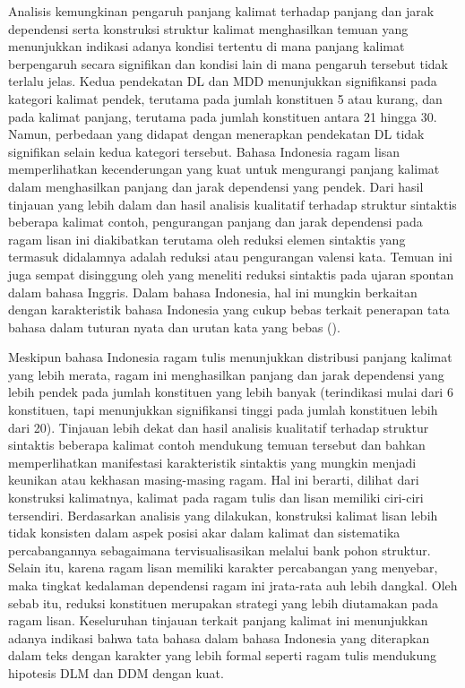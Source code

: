 Analisis kemungkinan pengaruh panjang kalimat terhadap panjang dan jarak dependensi serta konstruksi struktur kalimat menghasilkan temuan yang menunjukkan indikasi adanya kondisi tertentu di mana panjang kalimat berpengaruh secara signifikan dan kondisi lain di mana pengaruh tersebut tidak terlalu jelas. Kedua pendekatan DL dan MDD menunjukkan signifikansi pada kategori kalimat pendek, terutama pada jumlah konstituen 5 atau kurang, dan pada kalimat panjang, terutama pada jumlah konstituen antara 21 hingga 30. Namun, perbedaan yang didapat dengan menerapkan pendekatan DL tidak signifikan selain kedua kategori tersebut. Bahasa Indonesia ragam lisan memperlihatkan kecenderungan yang kuat untuk mengurangi panjang kalimat dalam menghasilkan panjang dan jarak dependensi yang pendek. Dari hasil tinjauan yang lebih dalam dan hasil analisis kualitatif terhadap struktur sintaktis beberapa kalimat contoh, pengurangan panjang dan jarak dependensi pada ragam lisan ini diakibatkan terutama oleh reduksi elemen sintaktis yang termasuk didalamnya adalah reduksi atau pengurangan valensi kata. Temuan ini juga sempat disinggung oleh \cite{jaeger2006redundancy} yang meneliti reduksi sintaktis  pada ujaran spontan dalam bahasa Inggris. Dalam bahasa Indonesia, hal ini mungkin berkaitan dengan karakteristik bahasa Indonesia yang cukup bebas terkait penerapan tata bahasa dalam tuturan nyata \citep{sneddon2010indonesian} dan urutan kata yang bebas (\citealp{sneddon2010indonesian, kridalaksana2002struktur}). 

Meskipun bahasa Indonesia ragam tulis menunjukkan distribusi panjang kalimat yang lebih merata, ragam ini menghasilkan panjang dan jarak dependensi yang lebih pendek pada jumlah konstituen yang lebih banyak (terindikasi mulai dari 6 konstituen, tapi menunjukkan signifikansi tinggi pada jumlah konstituen lebih dari 20). Tinjauan lebih dekat dan hasil analisis kualitatif terhadap struktur sintaktis beberapa kalimat contoh mendukung temuan tersebut dan bahkan memperlihatkan manifestasi karakteristik sintaktis yang mungkin menjadi keunikan atau kekhasan masing-masing ragam. Hal ini berarti, dilihat dari konstruksi kalimatnya, kalimat pada ragam tulis dan lisan memiliki ciri-ciri tersendiri. Berdasarkan analisis yang dilakukan, konstruksi kalimat lisan lebih tidak konsisten dalam aspek posisi akar dalam kalimat dan sistematika percabangannya sebagaimana tervisualisasikan melalui bank pohon struktur. Selain itu, karena ragam lisan memiliki karakter percabangan yang menyebar, maka tingkat kedalaman dependensi ragam ini jrata-rata auh lebih dangkal. Oleh sebab itu, reduksi konstituen merupakan strategi yang lebih diutamakan pada ragam lisan. Keseluruhan tinjauan terkait panjang kalimat ini menunjukkan adanya indikasi bahwa tata bahasa dalam bahasa Indonesia yang diterapkan dalam teks dengan karakter yang lebih formal seperti ragam tulis mendukung hipotesis DLM dan DDM dengan kuat. 

